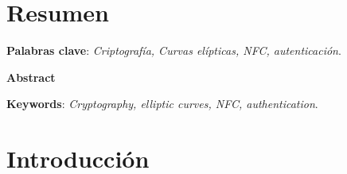 \documentclass[a4paper,12pt, twoside, openright,makeidx]{book}
\begin{document}
\listoffigures

\chapter*{Resumen}
\label{Resumen}


\label{Palabras clave}
\begin{center}
\textbf{Palabras clave}: \textit{Criptografía, Curvas elípticas, NFC, autenticación}.
\end{center}

\newpage
\label{Abstract}
\begin{center}
\textbf{Abstract}
\end{center}


\label{Keywords}
\begin{center}
\textbf{Keywords}: \textit{Cryptography, elliptic curves, NFC, authentication}.
\end{center}

\chapter{Introducción}
\label{Introducción}




%
%
%
%
%
%
%
%
%
\end{document}

